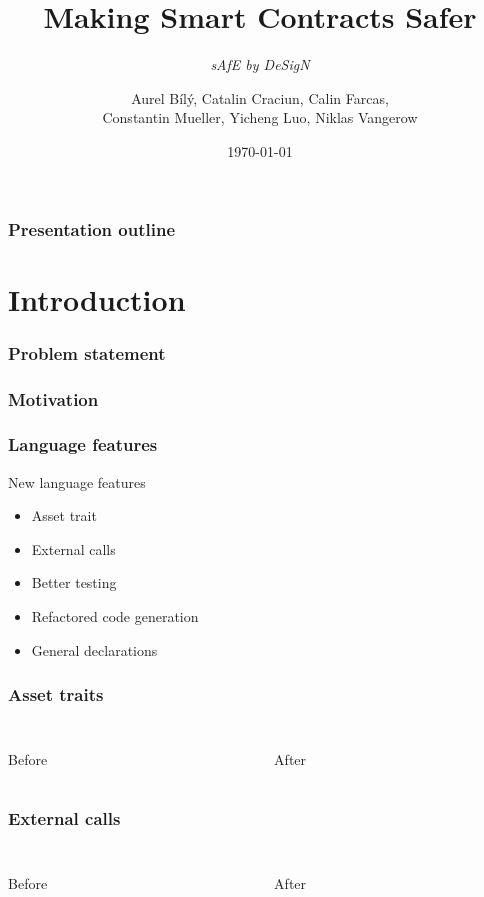\documentclass{beamer}
\title{Making Smart Contracts Safer}
\subtitle{{\it sAfE by DeSigN}}
\author{Aurel Bílý, Catalin Craciun, Calin Farcas,\\Constantin Mueller, Yicheng Luo, Niklas Vangerow}
\date{\today}
\begin{document}
\begin{frame}
\titlepage
\end{frame}

\begin{frame}
\frametitle{Presentation outline}
\tableofcontents
\end{frame}

\section{Introduction}

\begin{frame}
\frametitle{Problem statement}
\end{frame}

\begin{frame}
\frametitle{Motivation}

\end{frame}




\begin{frame}
\frametitle{Language features}
\begin{block}{New language features}
	{\tiny
	\begin{itemize}
		\item Asset trait
		\item External calls
		\item Better testing
		\item Refactored code generation
		\item General declarations
	\end{itemize}
	}
\end{block}
\end{frame}

\begin{frame}\frametitle{Asset traits}
\begin{columns}
\begin{column}{0.5\textwidth}
	\inputminted[fontsize=\tiny]{swift}{code/asset-traits-before.flint}
	Before
\end{column}
\begin{column}{0.5\textwidth}
	\inputminted[fontsize=\tiny]{swift}{code/asset-traits-after.flint}
	After
\end{column}
\end{columns}
\end{frame}

\begin{frame}
\frametitle{External calls}
\begin{columns}
\begin{column}{0.5\textwidth}
	\inputminted[fontsize=\tiny]{swift}{code/external-calls-before.flint}
	Before
\end{column}
\begin{column}{0.5\textwidth}
	\inputminted[fontsize=\tiny]{swift}{code/external-calls-after.flint}
	After
\end{column}
\end{columns}
\end{frame}
\end{document}
